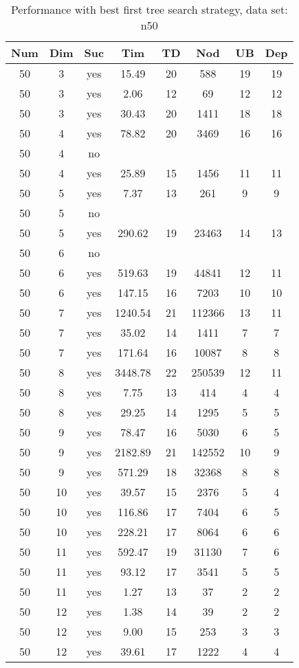 \begin{table}[!htb]
  \centering
  \begin{tabular}[center]{|c|c|c|c|c|c|c|c|}
    \hline
    Num & Dim & Suc & Tim & TD & Nod & UB & Dep \\
    \hline
    50 & 3 & yes & 15.49 & 20 & 588 & 19 & 19 \\
    50 & 3 & yes & 2.06 & 12 & 69 & 12 & 12 \\
    50 & 3 & yes & 30.43 & 20 & 1411 & 18 & 18 \\
    50 & 4 & yes & 78.82 & 20 & 3469 & 16 & 16 \\
    50 & 4 & no &  &  &  &  &  \\
    50 & 4 & yes & 25.89 & 15 & 1456 & 11 & 11 \\
    50 & 5 & yes & 7.37 & 13 & 261 & 9 & 9 \\
    50 & 5 & no &  &  &  &  &  \\
    50 & 5 & yes & 290.62 & 19 & 23463 & 14 & 13 \\
    50 & 6 & no &  &  &  &  &  \\
    50 & 6 & yes & 519.63 & 19 & 44841 & 12 & 11 \\
    50 & 6 & yes & 147.15 & 16 & 7203 & 10 & 10 \\
    50 & 7 & yes & 1240.54 & 21 & 112366 & 13 & 11 \\
    50 & 7 & yes & 35.02 & 14 & 1411 & 7 & 7 \\
    50 & 7 & yes & 171.64 & 16 & 10087 & 8 & 8 \\
    50 & 8 & yes & 3448.78 & 22 & 250539 & 12 & 11 \\
    50 & 8 & yes & 7.75 & 13 & 414 & 4 & 4 \\
    50 & 8 & yes & 29.25 & 14 & 1295 & 5 & 5 \\
    50 & 9 & yes & 78.47 & 16 & 5030 & 6 & 5 \\
    50 & 9 & yes & 2182.89 & 21 & 142552 & 10 & 9 \\
    50 & 9 & yes & 571.29 & 18 & 32368 & 8 & 8 \\
    50 & 10 & yes & 39.57 & 15 & 2376 & 5 & 4 \\
    50 & 10 & yes & 116.86 & 17 & 7404 & 6 & 5 \\
    50 & 10 & yes & 228.21 & 17 & 8064 & 6 & 6 \\
    50 & 11 & yes & 592.47 & 19 & 31130 & 7 & 6 \\
    50 & 11 & yes & 93.12 & 17 & 3541 & 5 & 5 \\
    50 & 11 & yes & 1.27 & 13 & 37 & 2 & 2 \\
    50 & 12 & yes & 1.38 & 14 & 39 & 2 & 2 \\
    50 & 12 & yes & 9.00 & 15 & 253 & 3 & 3 \\
    50 & 12 & yes & 39.61 & 17 & 1222 & 4 & 4 \\
    \hline
  \end{tabular}
  \caption{Performance with best first tree search strategy, data set: n50}
  \label{tab:test.sel-n50}
\end{table}

